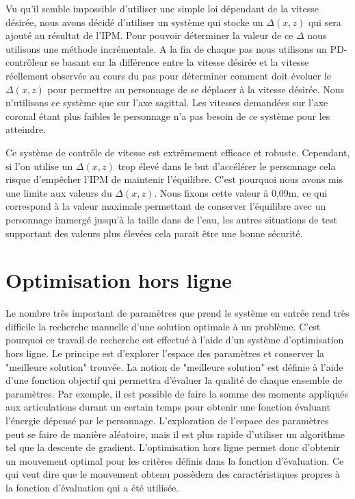 \documentclass[runningheads,a4paper]{llncs}
\begin{document}
Vu qu'il semble impossible d'utiliser une simple loi dépendant de la vitesse désirée, nous avons décidé d'utiliser un système qui stocke un $\Delta(x,z)$ qui sera ajouté au résultat de l'IPM. Pour pouvoir déterminer la valeur de ce $\Delta$ nous utilisons une méthode incrémentale. A la fin de chaque pas nous utilisons un PD-contrôleur se basant sur la différence entre la vitesse désirée et la vitesse réellement observée au cours du pas pour déterminer comment doit évoluer le $\Delta(x,z)$ pour permettre au personnage de se déplacer à la vitesse désirée. Nous n'utilisons ce système que sur l'axe sagittal. Les vitesses demandées sur l'axe coronal étant plus faibles le personnage n'a pas besoin de ce système pour les atteindre.

Ce système de contrôle de vitesse est extrêmement efficace et robuste. Cependant, si l'on utilise un $\Delta(x,z)$ trop élevé dans le but d'accélérer le personnage cela risque d'empêcher l'IPM de maintenir l'équilibre. C'est pourquoi nous avons mis une limite aux valeurs du $\Delta(x,z)$. Nous fixons cette valeur à 0,09m, ce qui correspond à la valeur maximale permettant de conserver l'équilibre avec un personnage immergé jusqu'à la taille dans de l'eau, les autres situations de test supportant des valeurs plus élevées cela parait être une bonne sécurité. 
%

\section{Optimisation hors ligne}
\label{sec:optimisation}
%
Le nombre très important de paramètres que prend le système en entrée rend très difficile la recherche manuelle d'une solution optimale à un problème. C'est pourquoi ce travail de recherche est effectué à l'aide d'un système d'optimisation hors ligne. Le principe est d'explorer l'espace des paramètres et conserver la "meilleure solution" trouvée. La notion de "meilleure solution"  est définie à l'aide d'une fonction objectif qui permettra d'évaluer la qualité de chaque ensemble de paramètres. Par exemple, il est possible de faire la somme des moments appliqués aux articulations durant un certain temps pour obtenir une fonction évaluant l'énergie dépensé par le personnage. L'exploration de l'espace des paramètres peut se faire de manière aléatoire, mais il est plus rapide d'utiliser un algorithme tel que la descente de gradient. L'optimisation hors ligne permet donc d'obtenir un mouvement optimal pour les critères définis dans la fonction d'évaluation. Ce qui veut dire que le mouvement obtenu possèdera des caractéristiques propres à la fonction d'évaluation qui a été utilisée.
\end{document}
